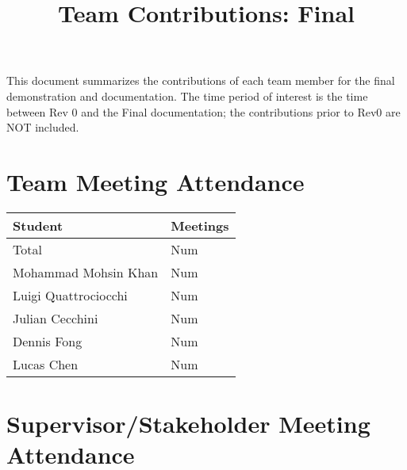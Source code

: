 \documentclass{article}
\title{Team Contributions: Final\\\progname}
\author{\authname}
\date{}
\begin{document}
\maketitle

This document summarizes the contributions of each team member for the final
demonstration and documentation.  The time period of interest is the time
between Rev 0 and the Final documentation; the contributions prior to Rev0 are
NOT included.

\section{Team Meeting Attendance}


\begin{table}[H]
\centering
\begin{tabular}{ll}
\toprule
\textbf{Student} & \textbf{Meetings}\\
\midrule
Total & Num\\
Mohammad Mohsin Khan & Num\\
Luigi Quattrociocchi & Num\\
Julian Cecchini & Num\\
Dennis Fong & Num\\
Lucas Chen & Num\\
\bottomrule
\end{tabular}
\end{table}


\section{Supervisor/Stakeholder Meeting Attendance}

\end{document}

